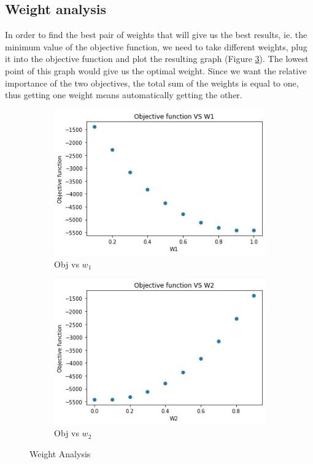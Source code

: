 \documentclass[12pt]{article}
\begin{document}
\subsection*{Weight analysis}
In order to find the best pair of weights that will give us the best results, ie. the minimum value of the objective function, we need to take different weights, plug it into the objective function and plot the resulting graph (Figure \ref{fig:w}). The lowest point of this graph would give us the optimal weight. Since we want the relative importance of the two objectives, the total sum of the weights is equal to one, thus getting one weight means automatically getting the other.

\begin{figure}[h]
    \centering
    \begin{subfigure}{0.5\textwidth}
        \centering
        \includegraphics[width=\linewidth]{weight_analysis_w1.jpg}
        \caption{Obj vs $w_1$}\label{fig1}
    \end{subfigure}%
    \begin{subfigure}{0.5\textwidth}
        \centering
        \includegraphics[width=\linewidth]{weight_analysis_w2.jpg}
        \caption{Obj vs $w_2$}\label{fig2}
    \end{subfigure}
    \caption{Weight Analysis}
    \label{fig:w}
\end{figure}
\end{document}

